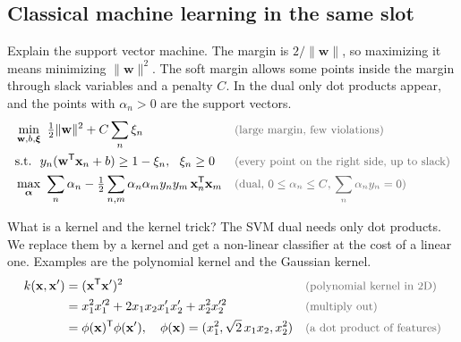 \subsection{Classical machine learning in the same slot}

\begin{qabox}{Explain the support vector machine.}
\explain The margin is $2/\lVert\mathbf{w}\rVert$, so maximizing it means minimizing
$\lVert\mathbf{w}\rVert^2$. The soft margin allows some points inside the margin through slack
variables and a penalty $C$. In the dual only dot products appear, and the points with
$\alpha_n > 0$ are the support vectors.
\derive
\begin{align*}
&\min_{\mathbf{w},b,\bm\xi}\ \tfrac12\lVert\mathbf{w}\rVert^2 + C\sum_n\xi_n \why{large margin, few violations} \\
&\text{s.t.}\ \ y_n(\mathbf{w}^{\mathsf{T}}\mathbf{x}_n + b) \ge 1 - \xi_n,\ \ \xi_n \ge 0 \why{every point on the right side, up to slack} \\
&\max_{\bm\alpha}\ \sum_n\alpha_n - \tfrac12\sum_{n,m}\alpha_n\alpha_m y_n y_m\,\mathbf{x}_n^{\mathsf{T}}\mathbf{x}_m \why{dual, $0 \le \alpha_n \le C$, $\sum_n\alpha_n y_n = 0$}
\end{align*}
\end{qabox}

\begin{qabox}{What is a kernel and the kernel trick?}
\explain The SVM dual needs only dot products. We replace them by a kernel and get a non-linear
classifier at the cost of a linear one. Examples are the polynomial kernel and the Gaussian kernel.
\derive
\begin{align*}
k(\mathbf{x},\mathbf{x}') &= (\mathbf{x}^{\mathsf{T}}\mathbf{x}')^2 \why{polynomial kernel in 2D} \\
&= x_1^2x_1'^2 + 2x_1x_2x_1'x_2' + x_2^2x_2'^2 \why{multiply out} \\
&= \phi(\mathbf{x})^{\mathsf{T}}\phi(\mathbf{x}'),\quad \phi(\mathbf{x}) = (x_1^2, \sqrt2\,x_1x_2, x_2^2) \why{a dot product of features}
\end{align*}
\end{qabox}

